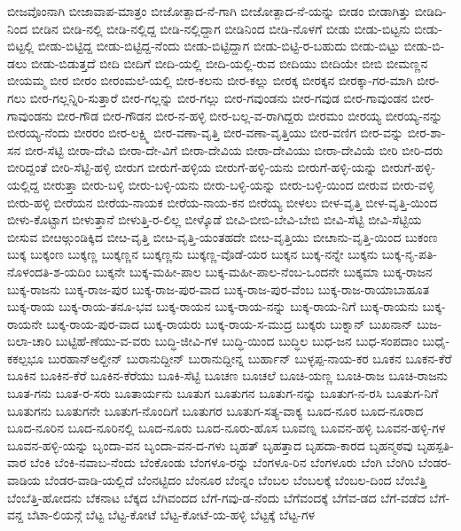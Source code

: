 ಬೀಜವೊಂನಾಗಿ
ಬೀಜಾವಾಪ-ಮಾತ್ರಂ
ಬೀಜೋತ್ಪಾದ-ನೆ-ಗಾಗಿ
ಬೀಜೋತ್ಪಾದ-ನೆ-ಯನ್ನು
ಬೀಡಂ
ಬೀಡಾಗಿತ್ತು
ಬೀಡಿದಿ-ನಿಂದ
ಬೀಡಿನ
ಬೀಡಿ-ನಲ್ಲಿ
ಬೀಡಿ-ನಲ್ಲಿದ್ದ
ಬೀಡಿ-ನಲ್ಲಿದ್ದಾಗ
ಬೀಡಿನಿಂದ
ಬೀಡಿ-ನೊಳಗೆ
ಬೀಡು
ಬೀಡು-ಬಿಟ್ಟನು
ಬೀಡು-ಬಿಟ್ಟಲ್ಲಿ
ಬೀಡು-ಬಿಟ್ಟಿದ್ದ
ಬೀಡು-ಬಿಟ್ಟಿದ್ದ-ನೆಂದು
ಬೀಡು-ಬಿಟ್ಟಿದ್ದಾಗ
ಬೀಡು-ಬಿಟ್ಟಿ-ರ-ಬಹುದು
ಬೀಡು-ಬಿಟ್ಟು
ಬೀಡು-ಬಿ-ಡಲು
ಬೀಡು-ಬಿಡುತ್ತದೆ
ಬೀದಿ
ಬೀದಿಗೆ
ಬೀದಿ-ಯಲ್ಲಿ
ಬೀದಿ-ಯಲ್ಲಿ-ರುವ
ಬೀದಿಯು
ಬೀದಿಯೇ
ಬೀಬಿ
ಬೀಮಣ್ಣನ
ಬೀಯಮ್ಮ
ಬೀರ
ಬೀರಂ
ಬೀರಂಮಲೆ-ಯಲ್ಲಿ
ಬೀರ-ಕಲನು
ಬೀರ-ಕಲ್ಲು
ಬೀರಕ್ಕ
ಬೀರಕ್ಕನ
ಬೀರಕ್ಕಾ-ಗರ-ಮಾಗಿ
ಬೀರ-ಗಲು
ಬೀರ-ಗಲ್ಲನ್ನಿರಿ-ಸುತ್ತಾರೆ
ಬೀರ-ಗಲ್ಲನ್ನು
ಬೀರ-ಗಲ್ಲು
ಬೀರ-ಗವುಂಡನು
ಬೀರ-ಗವುಡ
ಬೀರ-ಗಾವುಂಡನ
ಬೀರ-ಗಾವುಂಡನು
ಬೀರ-ಗೌಡ
ಬೀರ-ಗೌಡನ
ಬೀರ-ನ-ಹಳ್ಳಿ
ಬೀರ-ಬಲ್ಲ-ವ-ರಾಗಿದ್ದರು
ಬೀರಮಂ
ಬೀರಯ್ಯ
ಬೀರಯ್ಯ-ನನ್ನು
ಬೀರಯ್ಯ-ನೆಂದು
ಬೀರರಂ
ಬೀರ-ಲಕ್ಷ್ಮಿ
ಬೀರ-ವಣಾ-ವೃತ್ತಿ
ಬೀರ-ವಣಾ-ವೃತ್ತಿಯು
ಬೀರ-ವಣಿಗ
ಬೀರ-ವನ್ನು
ಬೀರ-ಶಾ-ಸನ
ಬೀರ-ಸೆಟ್ಟಿ
ಬೀರಾ-ದೇವಿ
ಬೀರಾ-ದೇ-ವಿಗೆ
ಬೀರಾ-ದೇವಿಯ
ಬೀರಾ-ದೇವಿಯು
ಬೀರಾ-ದೇವಿಯೆ
ಬೀರಿ
ಬೀರಿ-ದರು
ಬೀರಿದ್ದಂತೆ
ಬೀರಿ-ಸೆಟ್ಟಿ-ಹಳ್ಳಿ
ಬೀರುಗ
ಬೀರುಗೆ-ಹಳ್ಳಿಯ
ಬೀರುಗೆ-ಹಳ್ಳಿ-ಯನು
ಬೀರುಗೆ-ಹಳ್ಳಿ-ಯನ್ನು
ಬೀರುಗೆ-ಹಳ್ಳಿ-ಯಲ್ಲಿದ್ದ
ಬೀರುತ್ತಾ
ಬೀರು-ಬಳ್ಳಿ
ಬೀರು-ಬಳ್ಳಿ-ಯನು
ಬೀರು-ಬಳ್ಳಿ-ಯನ್ನು
ಬೀರು-ಬಳ್ಳಿ-ಯಿಂದ
ಬೀರುವ
ಬೀರು-ವಳ್ಳಿ
ಬೀರು-ಹಳ್ಳಿ
ಬೀರೆಯನ
ಬೀರೆಯ-ನಾಯಕ
ಬೀರೆಯ-ನಾಯ-ಕನ
ಬೀರೆಯ್ಯ
ಬೀಳಲು
ಬೀಳ-ವೃತ್ತಿ
ಬೀಳ-ವೃತ್ತಿ-ಯಿಂದ
ಬೀಳು-ಕೊಟ್ಟಾಗ
ಬೀಳುತ್ತಾನೆ
ಬೀಳುತ್ತಿ-ರ-ಲಿಲ್ಲ
ಬೀಳ್ಕೊಡೆ
ಬೀವಿ-ಬೀಬಿ-ಬೇವಿ-ಬೇಬಿ
ಬೀವಿ-ಸೆಟ್ಟಿ
ಬೀವಿ-ಸೆಟ್ಟಿಯ
ಬೀಸುವ
ಬೀೞಅ್ಗುಂಡಿಕ್ಕಿದ
ಬೀೞ-ವೃತ್ತಿ
ಬೀೞ-ವೃತ್ತಿ-ಯಂತಹದೇ
ಬೀೞ-ವೃತ್ತಿಯು
ಬೀೞಾನು-ವೃತ್ತಿ-ಯಿಂದ
ಬುಕಂಣ
ಬುಕ್ಕ
ಬುಕ್ಕಂಣ
ಬುಕ್ಕಣ್ಣ
ಬುಕ್ಕಣ್ಣನ
ಬುಕ್ಕಣ್ಣನು
ಬುಕ್ಕಣ್ಣ-ವೊಡೆ-ಯರ
ಬುಕ್ಕನ
ಬುಕ್ಕ-ನನ್ನೇ
ಬುಕ್ಕನು
ಬುಕ್ಕ-ನೃ-ಪತಿ-ನೊಳಂದತಿ-ಶ-ಯದಿಂ
ಬುಕ್ಕನೇ
ಬುಕ್ಕ-ಮಹೀ-ಪಾಲ
ಬುಕ್ಕ-ಮಹೀ-ಪಾಲ-ನೆಂಬ-ಒಂದನೇ
ಬುಕ್ಕಮಾ
ಬುಕ್ಕ-ರಾಜನ
ಬುಕ್ಕ-ರಾಜನು
ಬುಕ್ಕ-ರಾಜ-ಪುರ
ಬುಕ್ಕ-ರಾಜ-ಪುರ-ವಾದ
ಬುಕ್ಕ-ರಾಜ-ಪುರ-ವೆಂಬ
ಬುಕ್ಕ-ರಾಜ-ರಾಯಾಬಾಹೂತ
ಬುಕ್ಕ-ರಾಯ
ಬುಕ್ಕ-ರಾಯ-ತನೂ-ಭವ
ಬುಕ್ಕ-ರಾಯನ
ಬುಕ್ಕ-ರಾಯ-ನನ್ನು
ಬುಕ್ಕ-ರಾಯ-ನಿಗೆ
ಬುಕ್ಕ-ರಾಯನು
ಬುಕ್ಕ-ರಾಯನೇ
ಬುಕ್ಕ-ರಾಯ-ಪುರ-ವಾದ
ಬುಕ್ಕ-ರಾಯರು
ಬುಕ್ಕ-ರಾಯ-ಸ-ಮುದ್ರ
ಬುಕ್ಕರು
ಬುಕ್ನಾನ್
ಬುಖನಾನ್
ಬುಜ-ಬಲಾ-ಚಾರಿ
ಬುಟ್ಟಿಹೆ-ಣೆಯು-ವ-ವರು
ಬುದ್ಧಿ-ಜೀವಿ-ಗಳ
ಬುದ್ಧಿ-ಯಿಂದ
ಬುದ್ಧಿಲ
ಬುಧ-ಜನ
ಬುಧ-ಸಂಪದಾಂ
ಬುಧೈ-ಕಕಲ್ಪಭೂ
ಬುರಹಾನ್ಅಲ್ದೀನ್
ಬುರಾನುದ್ದೀನ್
ಬುರಾನುದ್ದೀನ್ನ
ಬುರ್ಹಾನ್
ಬುಳ್ಳಪ್ಪ-ನಾಯ-ಕರ
ಬೂಕನ
ಬೂಕನ-ಕೆರೆ
ಬೂಕಿನ
ಬೂಕಿನ-ಕೆರೆ
ಬೂಕಿನ-ಕೆರೆಯು
ಬೂಕಿ-ಸೆಟ್ಟಿ
ಬೂಚಣ
ಬೂಚಲೆ
ಬೂಚಿ-ಯಣ್ಣ
ಬೂಚಿ-ರಾಜ
ಬೂಚಿ-ರಾಜನು
ಬೂತ-ಗನು
ಬೂತ-ರ-ಸರು
ಬೂತಾರ್ಯನು
ಬೂತುಗ
ಬೂತುಗನ
ಬೂತುಗ-ನನ್ನು
ಬೂತುಗ-ನ-ರಸಿ
ಬೂತುಗ-ನಿಗೆ
ಬೂತುಗನು
ಬೂತುಗನೇ
ಬೂತುಗ-ನೊಂದಿಗೆ
ಬೂತುಗರ
ಬೂತುಗ-ಸತ್ಯ-ವಾಕ್ಯ
ಬೂದ-ನೂರ
ಬೂದ-ನೂರಾದ
ಬೂದ-ನೂರಿನ
ಬೂದ-ನೂರಿನಲ್ಲಿ
ಬೂದ-ನೂರು
ಬೂದ-ನೂರು-ಹೊಸ
ಬೂವಣ್ನ
ಬೂವನ-ಹಳ್ಳಿ
ಬೂವನ-ಹಳ್ಳಿ-ಗಳ
ಬೂವನ-ಹಳ್ಳಿ-ಯನ್ನು
ಬೃಂದಾ-ವನ
ಬೃಂದಾ-ವನ-ದ-ಗಳು
ಬೃಹತ್
ಬೃಹತ್ತಾದ
ಬೃಹದಾ-ಕಾರದ
ಬೃಹನ್ಮಠವು
ಬೃಹಸ್ಪತಿ-ವಾರ
ಬೆಂಕಿ
ಬೆಂಕಿ-ನವಾಬ-ನೆಂದು
ಬೆಂಕೊಂಡು
ಬೆಂಗಳೂ-ರನ್ನು
ಬೆಂಗಳೂ-ರಿನ
ಬೆಂಗಳೂರು
ಬೆಂಗಿ
ಬೆಂಗಿರಿ
ಬೆಂಡರ-ವಾಡಿಯ
ಬೆಂಡರ-ವಾಡಿ-ಯಲ್ಲಿದೆ
ಬೆಂನಟ್ಟಿದಂ
ಬೆಂನೂರ
ಬೆಂನ್ನಂ
ಬೆಂಬಲ
ಬೆಂಬಲಕ್ಕೆ
ಬೆಂಬಲ-ದಿಂದ
ಬೆಂಬೆತ್ತಿ
ಬೆಂಬೆತ್ತಿ-ಹೋದನು
ಬೆಕನಾಟ
ಬೆಕ್ಕದ
ಬೆಗಿವಂದದ
ಬೆಗೆ-ಗವು-ಡ-ನೆಂದು
ಬೆಗೆವಂದಕ್ಕೆ
ಬೆಗೆವ-ಡದ
ಬೆಗೆ-ವಡೆದ
ಬೆಗೆ-ವನ್ದ
ಬೆಟಾ-ಲಿಯನ್ಗೆ
ಬೆಟ್ಟ
ಬೆಟ್ಟ-ಕೋಟೆ
ಬೆಟ್ಟ-ಕೋಟೆ-ಯ-ಹಳ್ಳಿ
ಬೆಟ್ಟಕ್ಕೆ
ಬೆಟ್ಟ-ಗಳ
